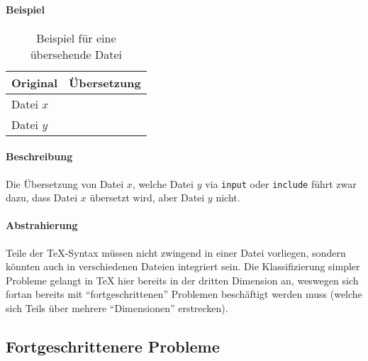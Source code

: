 \paragraph*{Beispiel}
\begin{table}[h!]
    \centering
    \begin{tabularx}{\textwidth}{X X}
        \toprule
            Original & Übersetzung\\
        \midrule
            Datei $x$  & \\[2em]
            Datei $y$  & \\
        \bottomrule
    \end{tabularx}
    \caption{Beispiel für eine übersehende Datei}\label{tab:problems:dim3}
\end{table}
\paragraph*{Beschreibung}
Die Übersetzung von Datei $x$, welche Datei $y$ via \texttt{input} oder \texttt{include} %
führt zwar dazu, dass Datei $x$ übersetzt wird, aber Datei $y$ nicht.
\paragraph*{Abstrahierung}%
Teile der \TeX-Syntax müssen nicht zwingend in einer Datei vorliegen, sondern könnten auch in verschiedenen Dateien integriert sein. Die Klassifizierung simpler Probleme gelangt in \TeX{} hier bereits in der dritten Dimension an, weswegen sich fortan bereits mit \enquote{fortgeschrittenen} Problemen beschäftigt werden muss (welche sich Teils über mehrere \enquote{Dimensionen} erstrecken).

\subsection{Fortgeschrittenere Probleme}\label{problems:advanced}
